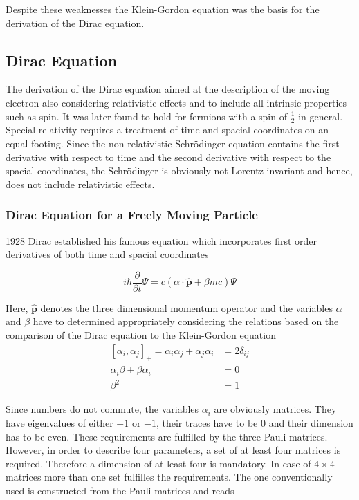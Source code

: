 Despite these weaknesses the Klein-Gordon equation was the basis for the
derivation of the Dirac equation.


\subsection{Dirac Equation}
The derivation of the Dirac equation aimed at the description of the
moving electron also considering relativistic effects and to include
all intrinsic properties such as spin.
It was later found to hold for fermions with a spin of $\frac12$ in general.
Special relativity requires a treatment of time and spacial coordinates on an
equal footing. Since the non-relativistic Schrödinger equation contains the first
derivative with respect to time and the second derivative with respect to the spacial
coordinates, the Schrödinger is obviously not Lorentz invariant and hence,
does not include relativistic effects.


\subsubsection{Dirac Equation for a Freely Moving Particle}\label{freep}
1928 Dirac established his famous equation which incorporates first order
derivatives of both time and spacial coordinates \cite{Dirac28_1}

\begin{equation}\label{diracg}
i\hbar \frac\partial{\partial t} \Psi = c (\alpha\cdot\hat{\mathbf{p}}+\beta mc) \Psi
\end{equation}

Here, $\hat{\mathbf{p}}$ denotes the three dimensional momentum operator and
the variables $\alpha$ and $\beta$ have to determined appropriately considering
the relations based on the comparison of the Dirac equation to the Klein-Gordon
equation
\begin{align}
\left[\alpha_i,\alpha_j\right]_+ = \alpha_i\alpha_j + \alpha_j\alpha_i
                                &= 2\delta_{ij}\\
  \alpha_i\beta + \beta\alpha_i &= 0 \\
  \beta^2                       &= 1
\end{align}

Since numbers do not commute, the variables $\alpha_i$ are obviously matrices.
They have eigenvalues of either $+1$ or $-1$, their traces have to be 0
and their dimension has to be even. These requirements are fulfilled by the
three Pauli matrices. However, in order to describe four parameters, a set of
at least four matrices is required. Therefore a dimension of at least four is
mandatory. In case of $4\times 4$ matrices more than one set fulfilles the
requirements. The one conventionally used is constructed from the Pauli matrices
and reads

